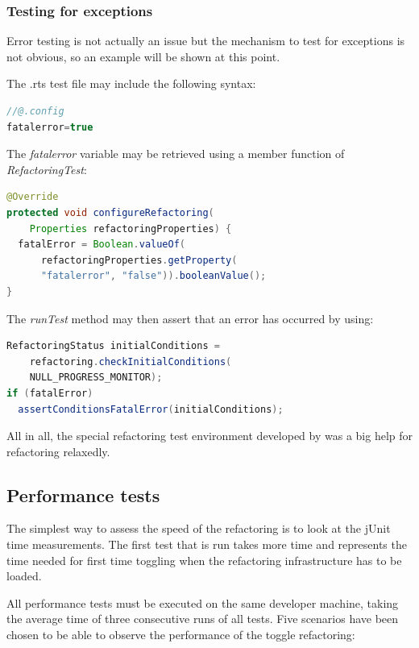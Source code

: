 \subsubsection{Testing for exceptions}

Error testing is not actually an issue but the mechanism to test for exceptions 
is not obvious, so an example will be shown at this point. 

The .rts test file may include the following syntax:

\begin{lstlisting}[caption={Syntax to set variables inside a .rts file},
language=java]
//@.config
fatalerror=true
\end{lstlisting}

The \textit{fatalerror} variable may be retrieved using a member function of \textit{RefactoringTest}:
\begin{lstlisting}[caption={Accessing a property set in the .rts file},
language=java]
@Override
protected void configureRefactoring(
    Properties refactoringProperties) {
  fatalError = Boolean.valueOf(
      refactoringProperties.getProperty(
      "fatalerror", "false")).booleanValue();
}
\end{lstlisting}

The \textit{runTest} method may then assert that an error has occurred by using:
\begin{lstlisting}[caption={Checking for errors inside the refactoring test class},language=java]
RefactoringStatus initialConditions = 
    refactoring.checkInitialConditions(
    NULL_PROGRESS_MONITOR);
if (fatalError)
  assertConditionsFatalError(initialConditions);
\end{lstlisting}

All in all, the special refactoring test environment developed by \cite{GB06} 
was a big help for refactoring relaxedly.

\subsection{Performance tests}

The simplest way to assess the speed of the refactoring is to look at the jUnit 
time measurements. The first test that is run takes more time and represents the 
time needed for first time toggling when the refactoring infrastructure has to 
be loaded. 

All performance tests must be executed on the same developer machine, taking the 
average time of three consecutive runs of all tests. Five scenarios have been 
chosen to be able to observe the performance of the toggle refactoring:

